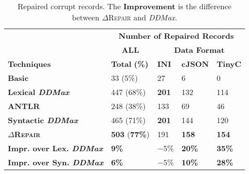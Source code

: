\documentclass[acmsmall,screen,review,anonymous]{acmart}
\newcommand{\formatfree}{format-free\xspace}
\newcommand{\dtask}{data repair\xspace}
\newcommand{\approach}{\textsc{$\Delta$Repair}\xspace}
\newcommand{\ddmax}{\textit{DDMax}\xspace}
\newcommand{\drepair}{\approach}
\begin{document}
\begin{table}[!tbp]
\centering
  \caption{Repaired corrupt records. The \textbf{Improvement} is the difference between \drepair and \ddmax.}
\begin{tabular}{|p{4.0cm}|p{1.5cm}|p{1.5cm}|p{1.5cm}|p{1.5cm}|}
\hline
&  \multicolumn{4}{c|}{\textbf{Number of Repaired Records}}  \\
&  \multicolumn{1}{c|}{\textbf{ALL}} & \multicolumn{3}{c|}{\textbf{Data Format}}  \\
\textbf{Techniques} & \textbf{Total} \textbf{(\%)} & \textbf{INI} & \textbf{cJSON} & \textbf{TinyC} \\
\hline
\textbf{Basic}   & 33 (5\%) & 27	 & 6 &	0\\
\textbf{Lexical \ddmax} & 447 (68\%) & \textbf{201}  & 132  & 114  \\ 		
\hline
\textbf{ANTLR} & 248 (38\%) & 133 & 69 & 46   \\
\textbf{Syntactic \ddmax} & 465 (71\%) & \textbf{201}  & 144  & 120  \\ 	
\hline
\textbf{\approach}  & \textbf{503} (\textbf{77\%}) & 191 & \textbf{158}  & \textbf{154} \\
\hline
 \textbf{Impr. over Lex. \ddmax} &  \textbf{9\%}  & $-$5\% & \textbf{20\%} & \textbf{35\%} \\
  \textbf{Impr. over Syn. \ddmax} &  \textbf{6\%}  & $-$5\% & \textbf{10\%} & \textbf{28\%} \\
\hline
\end{tabular}
\label{tab:effectiveness}
\end{table}

%
\end{document}
